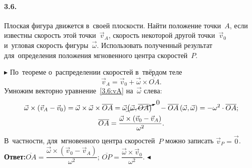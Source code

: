 \documentclass{weekly}
\begin{document}

\paragraph{3.6.} Плоская фигура движется в~своей плоскости.
Найти положение точки~$A$, если известны скорость этой точки~$\vec v_A$,
скорость некоторой другой точки~$\vec v_0$ и~угловая скорость
фигуры~$\vec\omega$. Использовать полученный результат для~определения
положения мгновенного центра скоростей~$P$.

$\blacktriangleright$ По~теореме о~распределении скоростей
в~твёрдом теле
\begin{equation}\label{3.6:vA}
    \vec v_A = \vec v_0 + \vec\omega \times \overline{OA}.
\end{equation}
Умножим векторно уравнение~\eqref{3.6:vA} на~$\vec\omega$ слева:
\begin{gather}
    \vec\omega \times \left(\vec v_A - \vec v_0\right) =
            \vec\omega \times \vec\omega \times \overline{OA}
        = \vec\omega \cancelto{0}
            {\left(\vec\omega, \overline{OA}\right)}\quad -
            \overline{OA} \left(\vec\omega, \vec\omega\right)
        = -\omega^2 \cdot \overline{OA}; \\[\parskip]
    \overline{OA} = \frac{\vec\omega \times
            \left(\vec v_0 - \vec v_A\right)}{\omega^2}.
\end{gather}
В~частности, для~мгновенного центра скоростей~$P$ можно записать
$\vec v_P = \vec 0$.\\[-\parskip]

\textbf{Ответ:}\quad $\overline{OA} = \dfrac{\vec\omega \times
\left(\vec v_0 - \vec v_A\right)}{\omega^2}$;\qquad
$\overline{OP} = \dfrac{\vec\omega \times \vec v_0}{\omega^2}$.
\hfill $\blacktriangleleft$
\end{document}
